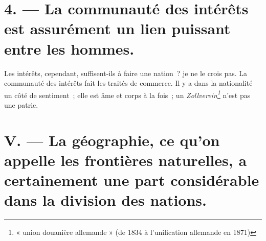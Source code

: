\documentclass[french,twoside]{book} %
\newcommand\foreign[1]{\emph{#1}}
\begin{document}
\section[{4. — La communauté des intérêts est assurément un lien puissant entre les hommes.}]{4. — La communauté des intérêts est assurément un lien puissant entre les hommes.}

\noindent Les intérêts, cependant, suffisent-ils à faire une nation ? je ne le crois pas. La communauté des intérêts fait les traités de commerce. Il y a dans la nationalité un côté de sentiment ; elle est âme et corps à la fois ; un \foreign{Zollverein\footnote{« union douanière allemande » (de 1834 à l’unification allemande en 1871)}} n’est pas une patrie.

\section[{V. — La géographie, ce qu’on appelle les frontières naturelles, a certainement une part considérable dans la division des nations.}]{V. — La géographie, ce qu’on appelle les frontières naturelles, a certainement une part considérable dans la division des nations.}
\end{document}
